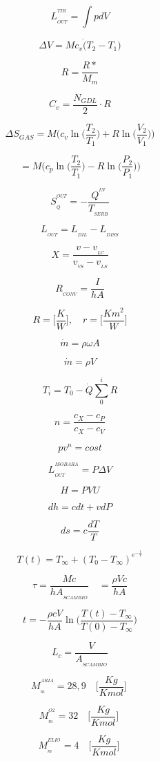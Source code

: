 \documentclass[10pt,portrait,a4paper]{article}
\begin{document}
\begin{multicols}{2}
		


\[L_{_{OUT}}^{^{TIR}}=\int pdV \]

\[\Delta V=Mc_{v}\dot (T_{2}-T_{1}) \]

\[R=\frac {R*}{M_{m}}\]

\[C_{v}=\frac{N_{GDL}}{2}\cdot R\]

\[\Delta S_{GAS} = M\bigg( c_v \ln \bigg( \frac{T_2}{T_1} \bigg)
		+R \ln \bigg( \frac{V_2}{V_1} \bigg) \bigg) \] \par
\[ = M\bigg( c_p \ln \bigg( \frac{T_2}{T_1} \bigg)
		- R \ln \bigg( \frac{P_2}{P_1} \bigg) \bigg)\]

\[ S_{_Q}^{^{OUT}}= - \frac{Q^{^{IN}}}{T_{_{SERB}}} \]

\[L_{_{OUT}}= L_{_{DIL}}- L_{_{DISS}} \]

\[ X =\frac{v - v_{_{LC}}}{v_{_{VS}} - v_{_{LS}}}\]


\[ R_{_{CONV}} =\frac{I}{hA}\]
	
\[ R = \Big [\frac {K}{W}\Big ], \quad  r =\Big [\frac{Km^{2}}{W} \Big ]\]



\[ \dot m = \rho \omega A \]

\[ \dot m = \rho V \]


\[ T_{i} = T_{0} - \dot Q \sum _{0}^{i} R \]	

\[ n = \frac {c_{X} - c_{P}}       {c_{X} - c_{V}} \]

\[pv^{n} = cost  \]

\[L_{_{OUT}}^{^{ISOBARA}}= P \Delta V \]

\[ H = PVU \]

\[ dh = cdt + vdP \]
	
\[ds= c \frac{dT}{T}\]

\[T(t) = T_{\infty} + (T_{0}-T_{\infty})^{e^{- \frac {t}{T}} }\]

\[ \tau = \frac {Mc}{hA_{_{SCAMBIO}}} \quad   = \frac{\rho Vc}{hA} \]

\[t = -  \frac {\rho cV}{hA} \ln \bigg ( \frac {T(t)-T_{\infty}}{T(0)-T_{\infty}}  \bigg )\]

\[ L_{c} = \frac {V}{A_{_{SCAMBIO}}} \]



\[ M_{_{m}}^{^{ARIA}} = 28,9 \quad \Big [ \frac {Kg}{Kmol} \Big ] \ \]

\[ M_{_{m}}^{^{O2}} = 32 \quad \Big [ \frac {Kg}{Kmol} \Big ] \ \]

\[ M_{_{m}}^{^{ELIO}} = 4 \quad \Big [ \frac {Kg}{Kmol} \Big ] \ \]


\end{multicols}
\end{document}

